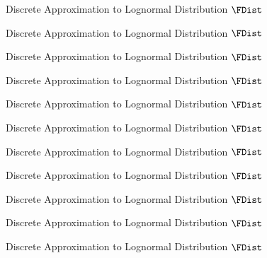 \begin{figure}
        \caption{Discrete Approximation to Lognormal Distribution $\FDist$}
        \label{fig:discreteapprox}
\end{figure}
\begin{figure}
        \caption{Discrete Approximation to Lognormal Distribution $\FDist$}
        \label{fig:discreteapprox}
\end{figure}
\begin{figure}
        \caption{Discrete Approximation to Lognormal Distribution $\FDist$}
        \label{fig:discreteapprox}
\end{figure}
\begin{figure}
        \caption{Discrete Approximation to Lognormal Distribution $\FDist$}
        \label{fig:discreteapprox}
\end{figure}
\begin{figure}
        \caption{Discrete Approximation to Lognormal Distribution $\FDist$}
        \label{fig:discreteapprox}
\end{figure}
\begin{figure}
        \caption{Discrete Approximation to Lognormal Distribution $\FDist$}
        \label{fig:discreteapprox}
\end{figure}
\begin{figure}
        \caption{Discrete Approximation to Lognormal Distribution $\FDist$}
        \label{fig:discreteapprox}
\end{figure}
\begin{figure}
        \caption{Discrete Approximation to Lognormal Distribution $\FDist$}
        \label{fig:discreteapprox}
\end{figure}
\begin{figure}
        \caption{Discrete Approximation to Lognormal Distribution $\FDist$}
        \label{fig:discreteapprox}
\end{figure}
\begin{figure}
        \caption{Discrete Approximation to Lognormal Distribution $\FDist$}
        \label{fig:discreteapprox}
\end{figure}
\begin{figure}
        \caption{Discrete Approximation to Lognormal Distribution $\FDist$}
        \label{fig:discreteapprox}
\end{figure}
